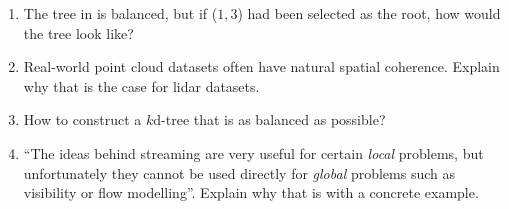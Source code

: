 \begin{enumerate}
  \item The tree in  is balanced, but if ($1,3$) had been selected as the root, how would the tree look like?
  \item Real-world point cloud datasets often have natural spatial coherence. Explain why that is the case for lidar datasets.
  \item How to construct a $k$d-tree that is as balanced as possible?
  \item ``The ideas behind streaming are very useful for certain \emph{local} problems, but unfortunately they cannot be used directly for \emph{global} problems such as visibility or flow modelling''. Explain why that is with a concrete example.
\end{enumerate}
